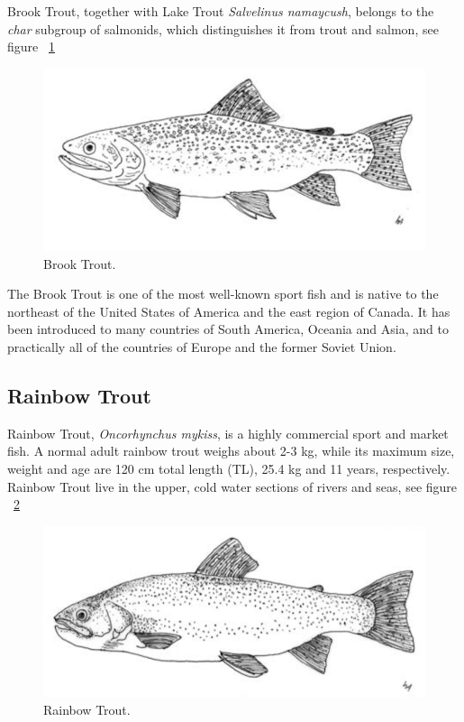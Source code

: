 Brook Trout, together with Lake Trout {\it Salvelinus namaycush}, belongs to the {\it char} 
subgroup of salmonids, which distinguishes it from trout and salmon, see figure  ~\ref{fig:BrookTrout}

\begin{figure}[H]
  \centering
   \includegraphics[scale = 0.5]{images/BrookTrout.png}
  \caption{Brook Trout.}
   \label{fig:BrookTrout}
\end{figure}

The Brook Trout is one of the most well-known sport fish and is native to the northeast of the United States of America and the east region of Canada. It has been introduced to many countries of South America, Oceania and Asia, and to practically all of the countries of Europe and the former Soviet Union.


\subsection{Rainbow Trout} 

Rainbow Trout, {\it Oncorhynchus mykiss}, is a highly commercial sport and market fish.
A normal adult rainbow trout weighs about 2-3 kg, while its maximum size, weight and age are 120 cm total length (TL), 25.4 kg and 11 years, respectively. Rainbow Trout live in the upper, cold water sections of rivers and seas, see figure  ~\ref{fig:RainbowTrout}

\begin{figure}[H]
  \centering
   \includegraphics[scale = 0.5]{images/RainbowTrout.png}
  \caption{Rainbow Trout.}
   \label{fig:RainbowTrout}
\end{figure}

